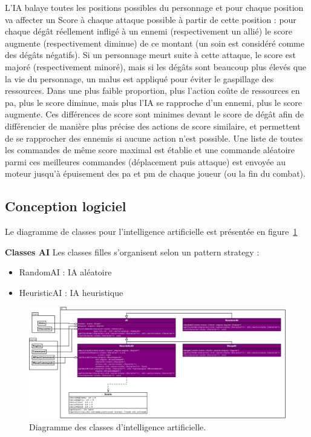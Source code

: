 \documentclass[a4paper,12pt]{article}
\begin{document}
L'IA balaye toutes les positions possibles du personnage et pour chaque position va affecter un Score à chaque attaque possible à partir de cette position : pour chaque dégât réellement infligé à un ennemi (respectivement un allié) le score augmente (respectivement diminue) de ce montant (un soin est considéré comme des dégâts négatifs). Si un personnage meurt suite à cette attaque, le score est majoré (respectivement minoré), mais si les dégâts sont beaucoup plus élevés que la vie du personnage, un malus est appliqué pour éviter le gaspillage des ressources. Dans une plus faible proportion, plus l'action coûte de ressources en pa, plus le score diminue, mais plus l'IA se rapproche d'un ennemi, plus le score augmente. Ces différences de score sont minimes devant le score de dégât afin de différencier de manière plus précise des actions de score similaire, et permettent de se rapprocher des ennemis si aucune action n'est possible.
Une liste de toutes les commandes de même score maximal est établie et une commande aléatoire parmi ces meilleures commandes (déplacement puis attaque) est envoyée au moteur jusqu'à épuisement des pa et pm de chaque joueur (ou la fin du combat).

\clearpage
\subsection{Conception logiciel}
Le diagramme de classes pour l'intelligence artificielle est présentée en figure~\ref{uml:ai}

\textbf{Classes AI} Les classes filles s'organisent selon un pattern strategy : 
\begin{itemize}
\item RandomAI : IA aléatoire
\item HeuristicAI : IA heuristique
\end{itemize}


\begin{landscape}
    \begin{figure}[p]
        \centering
        \includegraphics[width=0.9\paperheight,keepaspectratio]{ai.png}
        \caption{\label{uml:ai}Diagramme des classes d'intelligence artificielle.}
    \end{figure}
\end{landscape}
\end{document}
